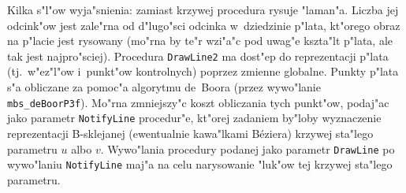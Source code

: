 \vspace{\medskipamount}
\vspace{\medskipamount}
 
Kilka s"l"ow wyja"snienia: zamiast krzywej procedura rysuje "laman"a. Liczba
jej odcink"ow jest zale"rna od d"lugo"sci odcinka w~dziedzinie p"lata,
kt"orego obraz na p"lacie jest rysowany (mo"rna by te"r wzi"a"c pod uwag"e
kszta"lt p"lata, ale tak jest najpro"sciej). Procedura \texttt{DrawLine2} ma
dost"ep do reprezentacji p"lata (tj.\ w"ez"l"ow i~punkt"ow kontrolnych)
poprzez zmienne globalne. Punkty p"lata s"a obliczane za pomoc"a algorytmu
de~Boora (przez wywo"lanie \texttt{mbs\_deBoorP3f}). Mo"rna zmniejszy"c
koszt obliczania tych punkt"ow, podaj"ac jako parametr
\texttt{NotifyLine} procedur"e, kt"orej zadaniem by"loby wyznaczenie
reprezentacji B-sklejanej (ewentualnie kawa"lkami B\'{e}ziera) krzywej
sta"lego parametru $u$ albo $v$. Wywo"lania procedury podanej jako
parametr \texttt{DrawLine} po wywo"laniu \texttt{NotifyLine} maj"a na celu
narysowanie "luk"ow tej krzywej sta"lego parametru.

